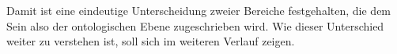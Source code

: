 Damit ist eine eindeutige Unterscheidung zweier Bereiche festgehalten, die dem Sein also der ontologischen Ebene zugeschrieben wird. Wie dieser Unterschied weiter zu verstehen ist, soll sich im weiteren Verlauf zeigen.

